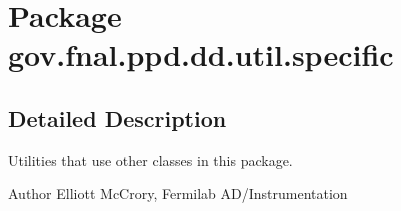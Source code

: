 \hypertarget{namespacegov_1_1fnal_1_1ppd_1_1dd_1_1util_1_1specific}{\section{Package gov.\-fnal.\-ppd.\-dd.\-util.\-specific}
\label{namespacegov_1_1fnal_1_1ppd_1_1dd_1_1util_1_1specific}
}


\subsection{Detailed Description}
Utilities that use other classes in this package.

\begin{DoxyAuthor}{Author}
Elliott Mc\-Crory, Fermilab A\-D/\-Instrumentation 
\end{DoxyAuthor}
